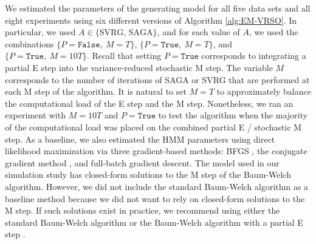 We estimated the parameters of the generating model for all five data sets and all eight experiments using six different versions of Algorithm \ref{alg:EM-VRSO}. In particular, we used $A \in \{\text{SVRG, SAGA}\}$, and for each value of $A$, we used the combinations $\{P = \texttt{False}, ~ M = T\}$, $\{P = \texttt{True}, ~ M = T\}$, and $\{P = \texttt{True}, ~ M = 10T\}$. Recall that setting $P = \texttt{True}$ corresponds to integrating a partial E step into the variance-reduced stochastic M step. The variable $M$ corresponds to the number of iterations of SAGA or SVRG that are performed at each M step of the algorithm. It is natural to set $M=T$ to approximately balance the computational load of the E step and the M step. Nonetheless, we ran an experiment with $M=10T$ and $P = \texttt{True}$ to test the algorithm when the majority of the computational load was placed on the combined partial E / stochastic M step. As a baseline, we also estimated the HMM parameters using direct likelihood maximization via three gradient-based methods: BFGS \citep{Fletcher:2000}, the conjugate gradient method \citep{Fletcher:1964}, and full-batch gradient descent. The model used in our simulation study has closed-form solutions to the M step of the Baum-Welch algorithm. However, we did not include the standard Baum-Welch algorithm as a baseline method because we did not want to rely on closed-form solutions to the M step. If such solutions exist in practice, we recommend using either the standard Baum-Welch algorithm or the Baum-Welch algorithm with a partial E step \citep{Neal:1998}.

